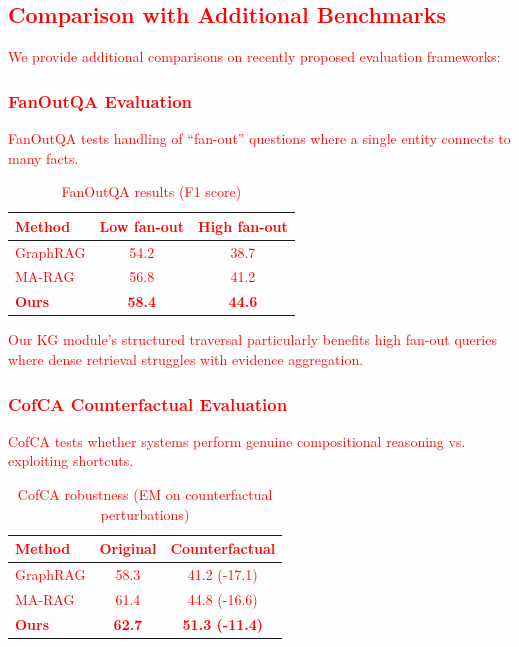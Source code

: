 \documentclass[10pt,twocolumn]{article}
\newcommand{\revisioncritical}[1]{\textcolor{red}{#1}}
\begin{document}
\revisioncritical{
\subsection{Comparison with Additional Benchmarks}
\label{sec:additional_benchmarks}

We provide additional comparisons on recently proposed evaluation frameworks:

\subsubsection{FanOutQA Evaluation}

FanOutQA \cite{zhu2024fanoutqa} tests handling of ``fan-out'' questions where a single entity connects to many facts. 

\begin{table}[h]
\centering
\caption{FanOutQA results (F1 score)}
\label{tab:fanoutqa}
\small
\begin{tabular}{@{}lcc@{}}
\toprule
\textbf{Method} & \textbf{Low fan-out} & \textbf{High fan-out} \\
\midrule
GraphRAG & 54.2 & 38.7 \\
MA-RAG & 56.8 & 41.2 \\
\textbf{Ours} & \textbf{58.4} & \textbf{44.6} \\
\bottomrule
\end{tabular}
\end{table}

Our KG module's structured traversal particularly benefits high fan-out queries where dense retrieval struggles with evidence aggregation.

\subsubsection{CofCA Counterfactual Evaluation}

CofCA \cite{wu2024cofca} tests whether systems perform genuine compositional reasoning vs. exploiting shortcuts.

\begin{table}[h]
\centering
\caption{CofCA robustness (EM on counterfactual perturbations)}
\label{tab:cofca}
\small
\begin{tabular}{@{}lcc@{}}
\toprule
\textbf{Method} & \textbf{Original} & \textbf{Counterfactual} \\
\midrule
GraphRAG & 58.3 & 41.2 (-17.1) \\
MA-RAG & 61.4 & 44.8 (-16.6) \\
\textbf{Ours} & \textbf{62.7} & \textbf{51.3 (-11.4)} \\
\bottomrule
\end{tabular}
\end{table}

}
\end{document}
